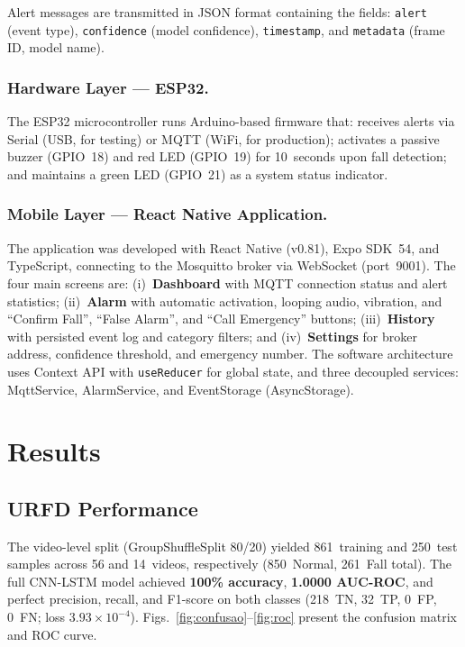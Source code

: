 \documentclass[runningheads]{llncs}
\begin{document}
Alert messages are transmitted in JSON format containing the fields: \texttt{alert} (event type), \texttt{confidence} (model confidence), \texttt{timestamp}, and \texttt{metadata} (frame ID, model name).

\subsubsection{Hardware Layer --- ESP32.}
The ESP32 microcontroller runs Arduino-based firmware that: receives alerts via Serial (USB, for testing) or MQTT (WiFi, for production); activates a passive buzzer (GPIO~18) and red LED (GPIO~19) for 10~seconds upon fall detection; and maintains a green LED (GPIO~21) as a system status indicator.

\subsubsection{Mobile Layer --- React Native Application.}
The application was developed with React Native (v0.81), Expo SDK~54, and TypeScript, connecting to the Mosquitto broker via WebSocket (port~9001). The four main screens are: (i)~\textbf{Dashboard} with MQTT connection status and alert statistics; (ii)~\textbf{Alarm} with automatic activation, looping audio, vibration, and ``Confirm Fall'', ``False Alarm'', and ``Call Emergency'' buttons; (iii)~\textbf{History} with persisted event log and category filters; and (iv)~\textbf{Settings} for broker address, confidence threshold, and emergency number. The software architecture uses Context API with \texttt{useReducer} for global state, and three decoupled services: MqttService, AlarmService, and EventStorage (AsyncStorage).

\section{Results}\label{sec:results}

\subsection{URFD Performance}\label{sec:urfd-results}

The video-level split (GroupShuffleSplit 80/20) yielded 861~training and 250~test samples across 56 and 14~videos, respectively (850~Normal, 261~Fall total). The full CNN-LSTM model achieved \textbf{100\% accuracy}, \textbf{1.0000 AUC-ROC}, and perfect precision, recall, and F1-score on both classes (218~TN, 32~TP, 0~FP, 0~FN; loss $3.93\times10^{-4}$). Figs.~\ref{fig:confusao}--\ref{fig:roc} present the confusion matrix and ROC curve.
\end{document}
